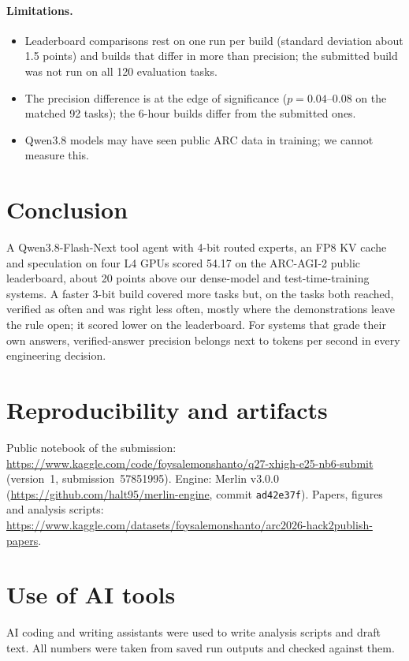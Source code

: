 \documentclass[11pt]{article}
\begin{document}
\paragraph{Limitations.}
\begin{itemize}
\item Leaderboard comparisons rest on one run per build (standard deviation about 1.5 points) and builds that differ in more than precision; the submitted build was not run on all 120 evaluation tasks.
\item The precision difference is at the edge of significance ($p=0.04$--$0.08$ on the matched 92 tasks); the 6-hour builds differ from the submitted ones.
\item Qwen3.8 models may have seen public ARC data in training; we cannot measure this.
\end{itemize}

\section{Conclusion}
A Qwen3.8-Flash-Next tool agent with 4-bit routed experts, an FP8 KV cache and speculation on four L4 GPUs scored 54.17 on the ARC-AGI-2 public leaderboard, about 20 points above our dense-model and test-time-training systems. A faster 3-bit build covered more tasks but, on the tasks both reached, verified as often and was right less often, mostly where the demonstrations leave the rule open; it scored lower on the leaderboard. For systems that grade their own answers, verified-answer precision belongs next to tokens per second in every engineering decision.

\section*{Reproducibility and artifacts}
Public notebook of the submission: \url{https://www.kaggle.com/code/foysalemonshanto/q27-xhigh-e25-nb6-submit} (version~1, submission~57851995). Engine: Merlin v3.0.0 (\url{https://github.com/halt95/merlin-engine}, commit \texttt{ad42e37f}). Papers, figures and analysis scripts: \url{https://www.kaggle.com/datasets/foysalemonshanto/arc2026-hack2publish-papers}.

\section*{Use of AI tools}
AI coding and writing assistants were used to write analysis scripts and draft text. All numbers were taken from saved run outputs and checked against them.




\appendix

\end{document}
